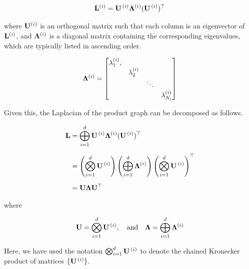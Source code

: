 \begin{equation}
    \mathbf{L}^{(i)} = \mathbf{U}^{\,(i)} \mathbf{\Lambda}^{(i)} (\mathbf{U}^{\,(i)})^\top
\end{equation}

\noindent where $ \mathbf{U}^{(i)}$ is an orthogonal matrix such that each column is an eigenvector of $\mathbf{L}^{(i)}$, and $\mathbf{\Lambda}^{(i)}$ is a diagonal matrix containing the corresponding eigenvalues, which are typically listed in ascending order. 

$$
\mathbf{\Lambda}^{(i)} = 
\begin{bmatrix}
    \lambda_1^{(i)}, &                 &        &                 \\
                     & \lambda_2^{(i)} &        &                 \\
                     &                 & \ddots &                 \\
                     &                 &        & \lambda_{N_i}^{(i)} \\
\end{bmatrix}
$$

Given this, the Laplacian of the product graph can be decomposed as follows. 

\begin{align}
    \mathbf{L} &= \bigoplus_{i=1}^d \mathbf{U}^{\,(i)} \mathbf{\Lambda}^{(i)} (\mathbf{U}^{\,(i)})^\top \notag \\[0.2cm]
    &= \left( \bigotimes_{i=1}^d  \mathbf{U}^{\,(i)} \right) \left(\bigoplus_{i=1}^d \mathbf{\Lambda}^{(i)} \right) \left(\bigotimes_{i=1}^d  \mathbf{U}^{\,(i)} \right)^\top \notag \\[0.2cm]
    &= \mathbf{U} \mathbf{\Lambda} \mathbf{U}^\top 
\end{align}

\noindent where 

$$
\mathbf{U} =  \bigotimes_{i=1}^d  \mathbf{U}^{\,(i)} , \quad \text{and} \quad \mathbf{\Lambda} =  \bigoplus_{i=1}^d \mathbf{\Lambda}^{(i)}
$$

Here, we have used the notation $\bigotimes_{i=1}^d  \mathbf{U}^{\,(i)}$ to denote the chained Kronecker product of matrices $\{\mathbf{U}^{\,(i)}  \}$. 

